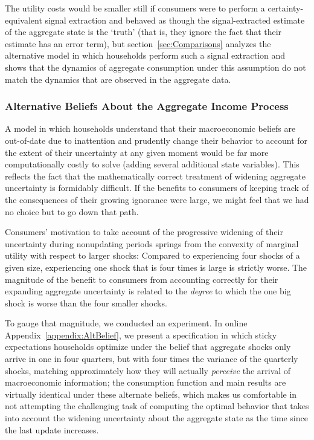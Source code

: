 \documentclass[titlepage]{./econtex}
\begin{document}
The utility costs would be smaller still if consumers were to perform a certainty-equivalent signal extraction and behaved as though the signal-extracted estimate of the aggregate state is the `truth' (that is, they ignore the fact that their estimate has an error term), but section~\ref{sec:Comparisons} analyzes the alternative model in which households perform such a signal extraction and shows that the dynamics of aggregate consumption under this assumption do not match the dynamics that are observed in the aggregate data.

\hypertarget{AltBeliefs}{}
\subsubsection{Alternative Beliefs About the Aggregate Income Process}
A model in which households understand that their macroeconomic beliefs are out-of-date due to inattention and prudently change their behavior to account for the extent of their uncertainty at any given moment would be far more computationally costly to solve (adding several additional state variables).  This reflects the fact that the mathematically correct treatment of widening aggregate uncertainty is formidably difficult.  If the benefits to consumers of keeping track of the consequences of their growing ignorance were large, we might feel that we had no choice but to go down that path.

Consumers' motivation to take account of the progressive widening of their uncertainty during nonupdating periods springs from the convexity of marginal utility with respect to larger shocks: Compared to experiencing four shocks of a given size, experiencing one shock that is four times is large is strictly worse.  The magnitude of the benefit to consumers from accounting correctly for their expanding aggregate uncertainty is related to the \textit{degree} to which the one big shock is worse than the four smaller shocks.

To gauge that magnitude, we conducted an experiment.  In online Appendix~\ref{appendix:AltBelief}, we present a specification in which sticky expectations households optimize under the belief that aggregate shocks only arrive in one in four quarters, but with four times the variance of the quarterly shocks, matching approximately how they will actually \textit{perceive} the arrival of macroeconomic information; the consumption function and main results are virtually identical under these alternate beliefs, which makes us comfortable in not attempting the challenging task of computing the optimal behavior that takes into account the widening uncertainty about the aggregate state as the time since the last update increases.
\end{document}
